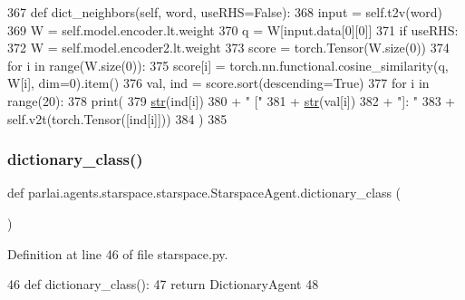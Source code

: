 \begin{DoxyCode}
367     \textcolor{keyword}{def }dict\_neighbors(self, word, useRHS=False):
368         input = self.t2v(word)
369         W = self.model.encoder.lt.weight
370         q = W[input.data[0][0]]
371         \textcolor{keywordflow}{if} useRHS:
372             W = self.model.encoder2.lt.weight
373         score = torch.Tensor(W.size(0))
374         \textcolor{keywordflow}{for} i \textcolor{keywordflow}{in} range(W.size(0)):
375             score[i] = torch.nn.functional.cosine\_similarity(q, W[i], dim=0).item()
376         val, ind = score.sort(descending=\textcolor{keyword}{True})
377         \textcolor{keywordflow}{for} i \textcolor{keywordflow}{in} range(20):
378             print(
379                 \hyperlink{namespacegenerate__task__READMEs_a5b88452ffb87b78c8c85ececebafc09f}{str}(ind[i])
380                 + \textcolor{stringliteral}{" ["}
381                 + \hyperlink{namespacegenerate__task__READMEs_a5b88452ffb87b78c8c85ececebafc09f}{str}(val[i])
382                 + \textcolor{stringliteral}{"]: "}
383                 + self.v2t(torch.Tensor([ind[i]]))
384             )
385 
\end{DoxyCode}
\mbox{\label{classparlai_1_1agents_1_1starspace_1_1starspace_1_1StarspaceAgent_a04d4db961ea8e3ed0ca1cb4cc7a7eca5}} 
\subsubsection{\texorpdfstring{dictionary\+\_\+class()}{dictionary\_class()}}
{\footnotesize\ttfamily def parlai.\+agents.\+starspace.\+starspace.\+Starspace\+Agent.\+dictionary\+\_\+class (\begin{DoxyParamCaption}{ }\end{DoxyParamCaption})\hspace{0.3cm}{\ttfamily [static]}}



Definition at line 46 of file starspace.\+py.


\begin{DoxyCode}
46     \textcolor{keyword}{def }dictionary\_class():
47         \textcolor{keywordflow}{return} DictionaryAgent
48 
\end{DoxyCode}
\mbox{\label{classparlai_1_1agents_1_1starspace_1_1starspace_1_1StarspaceAgent_a9591d5f485debcf4611e24be38900b5e}} 
